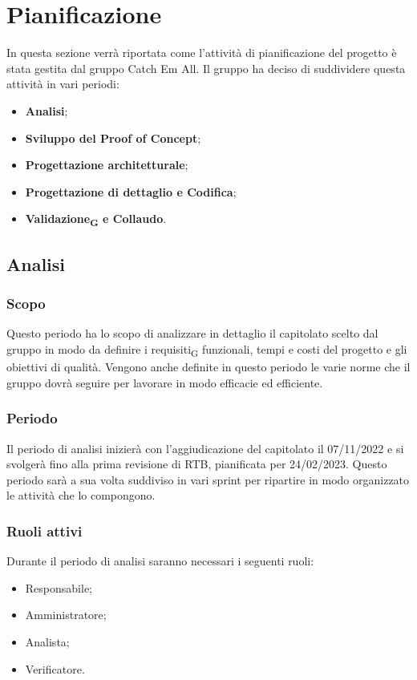 \section{Pianificazione}
In questa sezione verrà riportata come l'attività di pianificazione del progetto è stata gestita dal gruppo Catch Em All. Il gruppo ha deciso di suddividere questa attività in vari periodi: 
\begin{itemize}
	\item \textbf{Analisi};
	\item \textbf{Sviluppo del Proof of Concept};
	\item \textbf{Progettazione architetturale};
    \item \textbf{Progettazione di dettaglio e Codifica};
	\item \textbf{Validazione\textsubscript{G} e Collaudo}.
\end{itemize}

\subsection{Analisi}
\subsubsection{Scopo}
Questo periodo ha lo scopo di analizzare in dettaglio il capitolato scelto dal gruppo in modo da definire i requisiti\textsubscript{G} funzionali, tempi e costi del progetto e gli obiettivi di qualità. Vengono anche definite in questo periodo le varie norme che il gruppo dovrà seguire per lavorare in modo efficacie ed efficiente.

\subsubsection{Periodo}
Il periodo di analisi inizierà con l'aggiudicazione del capitolato il 07/11/2022 e si svolgerà fino alla prima revisione di RTB, pianificata per 24/02/2023. Questo periodo sarà a sua volta suddiviso in vari sprint per ripartire in modo organizzato le attività che lo compongono.

\subsubsection{Ruoli attivi}
Durante il periodo di analisi saranno necessari i seguenti ruoli:
\begin{itemize}
	\item Responsabile;
	\item Amministratore;
	\item Analista;
	\item Verificatore.
\end{itemize}

